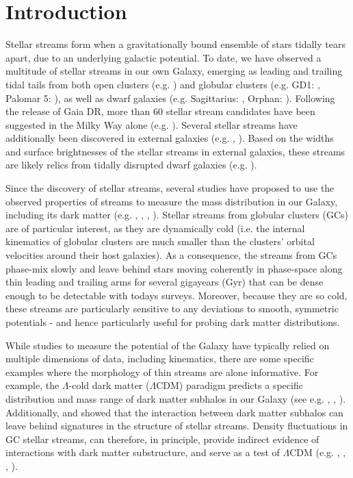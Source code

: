 \documentclass[twocolumn]{aastex62}
\begin{document}
\section{Introduction} \label{sec:intro}
Stellar streams form when a gravitationally bound ensemble of stars tidally tears apart, due to an underlying galactic potential. To date, we have observed a multitude of stellar streams in our own Galaxy, emerging as leading and trailing tidal tails from both open clusters (e.g. \citealt{roser19}) and globular clusters (e.g. GD1: \citealt{grillmair06}, Palomar 5: \citealt{oden01}), as well as dwarf galaxies (e.g. Sagittarius: \citealt{ibata01}, Orphan: \citealt{belokurov06}). Following the release of Gaia DR, more than 60 stellar stream candidates have been suggested in the Milky Way alone (e.g. \citealt{ibata19}). 
Several stellar streams have additionally been discovered in external galaxies (e.g. \citealt{ibata00}, \citealt{delgado10}). Based on the widths and surface brightnesses of the stellar streams in external galaxies, these streams are likely relics from tidally disrupted dwarf galaxies (e.g. \citealt{delgado12}).

Since the discovery of stellar streams, several studies have proposed to use the observed properties of streams to measure the mass distribution in our Galaxy, including its dark matter (e.g. \citealt{johnston99}, \citealt{koposov10}, \citealt{law10}, \citealt{bovy16}). Stellar streams from globular clusters (GCs) are of particular interest, as they are dynamically cold (i.e. the internal kinematics of globular clusters are much smaller than the clusters' orbital velocities around their host galaxies). As a consequence, the streams from GCs phase-mix slowly and leave behind stars moving coherently in phase-space along thin leading and trailing arms for several gigayears (Gyr) that can be dense enough to be detectable with todays surveys. %
Moreover, because they are so cold, these streams are particularly sensitive to any deviations to smooth, symmetric potentials - and hence particularly useful for probing dark matter distributions.

While studies to measure the potential of the Galaxy have typically relied on multiple dimensions of data, including kinematics, there are some specific examples where the morphology of thin streams are alone informative. For example, the $\Lambda$-cold dark matter ($\Lambda$CDM) paradigm predicts a specific distribution and mass range of dark matter subhalos in our Galaxy (see e.g. \citealt{diemand08}, \citealt{bovy17}, \citealt{bonaca19}). Additionally, \citet{ibata02} and \citet{johnston02} showed that the interaction between dark matter subhalos can leave behind signatures in the structure of stellar streams. Density fluctuations in GC stellar streams, can therefore, in principle, provide indirect evidence of interactions with dark matter substructure, and serve as a test of $\Lambda$CDM (e.g. \citealt{yoon11}, \citealt{erkal16}, \citealt{bovy17}, \citealt{bonaca19}).
\end{document}
